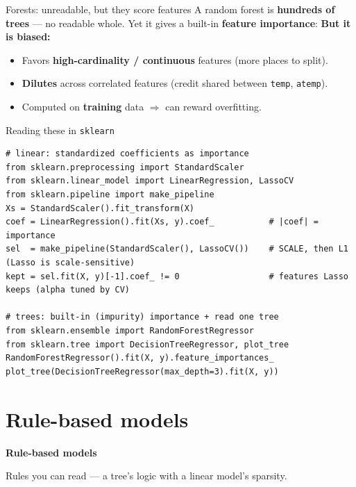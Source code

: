 \documentclass[aspectratio=169]{beamer}
\begin{document}
\begin{frame}{Forests: unreadable, but they score features}
  A random forest is \textbf{hundreds of trees} --- no readable whole. Yet it gives a built-in
  \textbf{feature importance}:
  \vfill
  \vfill
  \textbf{But it is biased:}
  \begin{itemize}\small
    \item Favors \textbf{high-cardinality / continuous} features (more places to split).
    \item \textbf{Dilutes} across correlated features (credit shared between \texttt{temp},
      \texttt{atemp}).
    \item Computed on \textbf{training} data $\Rightarrow$ can reward overfitting.
  \end{itemize}
\end{frame}

\begin{frame}[fragile]{Reading these in \texttt{sklearn}}
\begin{lstlisting}
# linear: standardized coefficients as importance
from sklearn.preprocessing import StandardScaler
from sklearn.linear_model import LinearRegression, LassoCV
from sklearn.pipeline import make_pipeline
Xs = StandardScaler().fit_transform(X)
coef = LinearRegression().fit(Xs, y).coef_           # |coef| = importance
sel  = make_pipeline(StandardScaler(), LassoCV())    # SCALE, then L1 (Lasso is scale-sensitive)
kept = sel.fit(X, y)[-1].coef_ != 0                  # features Lasso keeps (alpha tuned by CV)

# trees: built-in (impurity) importance + read one tree
from sklearn.ensemble import RandomForestRegressor
from sklearn.tree import DecisionTreeRegressor, plot_tree
RandomForestRegressor().fit(X, y).feature_importances_
plot_tree(DecisionTreeRegressor(max_depth=3).fit(X, y))
\end{lstlisting}
\end{frame}

\section{Rule-based models}

\begin{frame}[plain]
  \vfill
  \begin{center}
    {\Large\color{popblue}\textbf{Rule-based models}}\\[0.9em]
    \begin{minipage}{0.82\textwidth}\centering\small
      Rules you can read --- a tree's logic with a linear model's sparsity.
    \end{minipage}
  \end{center}
  \vfill
\end{frame}
\end{document}
